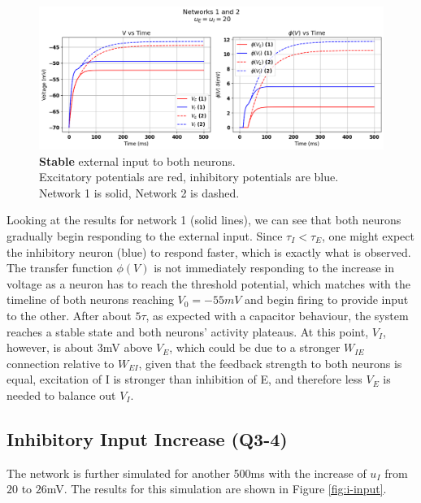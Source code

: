 \documentclass[10pt,twocolumn]{article}
\begin{document}
\begin{figure}
    \centering
    \captionsetup{justification=centering}
    \includegraphics[width=1\textwidth]{images/12-stable.png}
    \caption{
        \textbf{Stable} external input to both neurons.\\
        Excitatory potentials are red, inhibitory potentials are blue. \\
        Network 1 is solid, Network 2 is dashed.
    }
    \label{fig:stable-input}
\end{figure}

Looking at the results for network 1 (solid lines), we can see that both neurons
gradually begin responding to the external input. Since $\tau_I < \tau_E$,
one might expect the inhibitory neuron (blue) to respond faster, which is
exactly what is observed. The transfer function $\phi(V)$ is not immediately
responding to the increase in voltage as a neuron has to reach the threshold
potential, which matches with the timeline of both neurons reaching $V_0=-55mV$
and begin firing to provide input to the other. After about $5\tau$, as
expected with a capacitor behaviour, the system reaches a stable state
and both neurons' activity plateaus. At this point, $V_I$, however,
is about 3mV above $V_E$, which could be due to a stronger $W_{IE}$ connection
relative to $W_{EI}$, given that the feedback strength to both neurons is equal,
excitation of I is stronger than inhibition of E, and therefore less $V_E$
is needed to balance out $V_I$.

\subsection{Inhibitory Input Increase (Q3-4)}
The network is further simulated for another 500ms with
the increase of $u_I$ from $20$ to $26$mV. The results for
this simulation are shown in Figure \ref{fig:i-input}.
\end{document}
